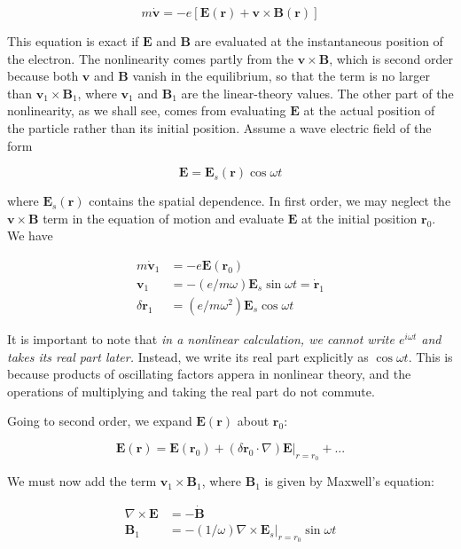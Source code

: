 \documentclass[
  notoc %
]{tufte-book}
\begin{document}
\[
m\dot{\mathbf{v}} = -e[\mathbf{E}(\mathbf{r}) + \mathbf{v}\times\mathbf{B}(\mathbf{r})]
\]

This equation is exact if \(\mathbf{E}\) and \(\mathbf{B}\) are
evaluated at the instantaneous position of the electron. The
nonlinearity comes partly from the \(\mathbf{v}\times\mathbf{B}\), which
is second order because both \(\mathbf{v}\) and \(\mathbf{B}\) vanish in
the equilibrium, so that the term is no larger than
\(\mathbf{v}_1\times\mathbf{B}_1\), where \(\mathbf{v}_1\) and
\(\mathbf{B}_1\) are the linear-theory values. The other part of the
nonlinearity, as we shall see, comes from evaluating \(\mathbf{E}\) at
the actual position of the particle rather than its initial position.
Assume a wave electric field of the form

\[
\mathbf{E} = \mathbf{E}_s(\mathbf{r})\cos\omega t
\]

where \(\mathbf{E}_s(\mathbf{r})\) contains the spatial dependence. In
first order, we may neglect the \(\mathbf{v}\times\mathbf{B}\) term in
the equation of motion and evaluate \(\mathbf{E}\) at the initial
position \(\mathbf{r}_0\). We have

\[
\begin{aligned}
m\dot{\mathbf{v}}_1 &=  -e\mathbf{E}(\mathbf{r}_0)\\
\mathbf{v}_1 &= -(e/m\omega)\mathbf{E}_s\sin\omega t = \dot{\mathbf{r}}_1 \\
\delta \mathbf{r}_1 &= (e/m\omega^2)\mathbf{E}_s\cos\omega t
\end{aligned}
\]

It is important to note that \emph{in a nonlinear calculation, we cannot
write \(e^{i\omega t}\) and takes its real part later.} Instead, we
write its real part explicitly as \(\cos\omega t\). This is because
products of oscillating factors appera in nonlinear theory, and the
operations of multiplying and taking the real part do not commute.

Going to second order, we expand \(\mathbf{E}(\mathbf{r})\) about
\(\mathbf{r}_0\):

\[
\mathbf{E}(\mathbf{r}) = \mathbf{E}(\mathbf{r}_0) + (\delta\mathbf{r}_0\cdot\nabla)\mathbf{E}|_{r=r_0} + ...
\]

We must now add the term \(\mathbf{v}_1\times\mathbf{B}_1\), where
\(\mathbf{B}_1\) is given by Maxwell's equation:

\[
\begin{aligned}
\nabla\times\mathbf{E} &= -\dot{\mathbf{B}} \\
\mathbf{B}_1 &= -(1/\omega)\nabla\times\mathbf{E}_s|_{r=r_0}\sin\omega t
\end{aligned}
\]
\end{document}
